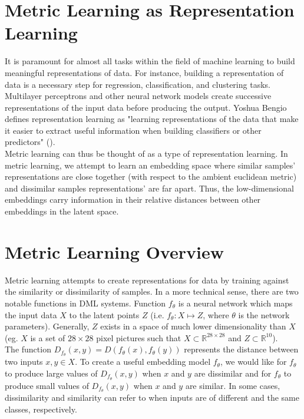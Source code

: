 \documentclass[./dissertation.tex]{subfiles}
\begin{document}
    
    \section{Metric Learning as Representation Learning}
    It is paramount for almost all tasks within the field of machine learning to build meaningful representations of data. For instance, building a representation of data is a necessary step for regression, classification, and clustering tasks. Multilayer perceptrons and other neural network models create successive representations of the input data before producing the output. Yoshua Bengio defines representation learning as "learning representations of the data that make it easier to extract useful information when building classifiers or other predictors" (\cite{bengio2013representation}).\\
    
    Metric learning can thus be thought of as a type of representation learning. In metric learning, we attempt to learn an embedding space where similar samples' representations are close together (with respect to the ambient euclidean metric) and dissimilar samples representations' are far apart. Thus, the low-dimensional embeddings carry information in their relative distances between other embeddings in the latent space. 

    \section{Metric Learning Overview}
    Metric learning attempts to create representations for data by training against the similarity or dissimilarity of samples. In a more technical sense, there are two notable functions in DML systems. Function $f_{\theta}$ is a neural network which maps the input data $X$ to the latent points $Z$ (i.e. $f_{\theta}: X \mapsto Z$, where $\theta$ is the network parameters). Generally, $Z$ exists in a space of much lower dimensionality than $X$ (eg. $X$ is a set of $28 \times 28$ pixel pictures such that $X \subset \mathbb{R}^{28 \times 28}$ and $Z \subset \mathbb{R}^{10}$).\\
    
    The function $D_{f_{\theta}}(x, y) = D(f_{\theta}(x), f_{\theta}(y))$ represents the distance between two inputs $x, y \in X$. To create a useful embedding model $f_{\theta}$, we would like for $f_{\theta}$ to produce large values of $D_{f_{\theta}}(x, y)$ when $x$ and $y$ are dissimilar and for $f_{\theta}$ to produce small values of $D_{f_{\theta}}(x, y)$ when $x$ and $y$ are similar. In some cases, dissimilarity and similarity can refer to when inputs are of different and the same classes, respectively. \\
    
\end{document}
